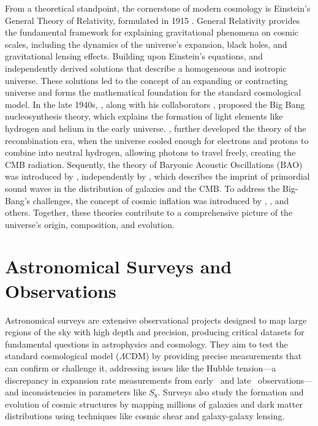 From a theoretical standpoint, the cornerstone of modern cosmology is 
Einstein's General Theory of Relativity, formulated in 1915 \citep{1915SPAW.......844E}. General Relativity provides the fundamental framework for explaining gravitational phenomena on cosmic scales, including the dynamics of the universe's expansion, black holes, and gravitational lensing effects. Building upon Einstein's equations, \citet{1922ZPhy...10..377F} and \citet{1931MNRAS..91..483L} independently derived solutions that describe a homogeneous and isotropic universe. These solutions led to the concept of an expanding or contracting universe and forms the mathematical foundation for the standard cosmological model. In the late 1940s, \citet{1948Natur.162..680G}, along with his collaborators \citet{1948Natur.162..774A}, proposed the Big Bang nucleosynthesis theory, which explains the formation of light elements like hydrogen and helium in the early universe. 
\citet{1968ApJ...153....1P}, \citet{1969Ap&SS...4..301Z} further developed the theory of the recombination era, when the universe cooled enough for electrons and protons to combine into neutral hydrogen, allowing photons to travel freely, creating the CMB radiation. Sequently, the theory of Baryonic Acoustic Oscillations (BAO) was introduced by \citet{1970Ap&SS...7....3S}, independently by \citet{1970ApJ...162..815P}, which describes the imprint of primordial sound waves in the distribution of galaxies and the CMB. To address the Big-Bang's challenges, the concept of cosmic inflation was introduced by \citet{1981PhRvD..23..347G}, \citet{1982PhLB..108..389L}, and others. Together, these theories contribute to a comprehensive picture of the universe's origin, composition, and evolution.

\section{Astronomical Surveys and Observations}
Astronomical surveys are extensive observational projects designed to map large regions of the sky with high depth and precision, producing critical datasets for fundamental questions in astrophysics and cosmology. They aim to test the standard cosmological model ($\Lambda$CDM) by providing precise measurements that can confirm or challenge it, addressing issues like the Hubble tension—a discrepancy in expansion rate measurements from early~\citep{2016A&A...594A..13P} and late~\citep{2019ApJ...876...85R} observations—and inconsistencies in parameters like $S_8$. Surveys also study the formation and evolution of cosmic structures by mapping millions of galaxies and dark matter distributions using techniques like cosmic shear and galaxy-galaxy lensing\citep{2013MNRAS.432.1544M, 2022PhRvD.105b3520A}.

